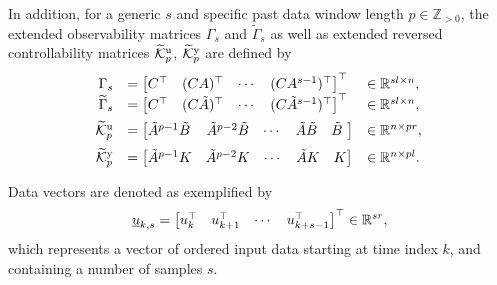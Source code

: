 In addition, for a generic $s$ and specific past data window length $p\in\mathbb{Z}_{>0}$, the extended observability matrices $\Gamma_s$ and $\widetilde{\Gamma}_s$ as well as extended reversed controllability matrices $\widetilde{\mathcal{K}}_{p}^{\mathrm{{u}}}$, $\widetilde{\mathcal{K}}_{p}^{\mathrm{{y}}}$ are defined by
$$\begin{array}{rll}
\Gamma_s &= \begin{bmatrix}C^\top & (CA)^\top & \cdots & (CA^{s-1})^\top\end{bmatrix}^\top&\in\mathbb{R}^{sl\times n},\\
\widetilde{\Gamma}_s &= \begin{bmatrix}C^\top & (C\tilde{A})^\top & \cdots & (C\tilde{A}^{s-1})^\top\end{bmatrix}^\top&\in\mathbb{R}^{sl\times n},\\
\tKp{u} &= \begin{bmatrix} \tilde{A}^{p-1}\tilde{B}\, & \tilde{A}^{p-2}\tilde{B} & \cdots & \tilde{A}\tilde{B} & \tilde{B}\,\,\end{bmatrix}&\in\mathbb{R}^{n\times pr},\vphantom{\bigg|}\\%
\tKp{y} &= \begin{bmatrix} \tilde{A}^{p-1}K & \tilde{A}^{p-2}K & \cdots & \tilde{A}K & K \end{bmatrix}&\in\mathbb{R}^{n\times pl}.
\end{array}$$

Data vectors are denoted as exemplified by
\begin{align*}
    \underline{u}_{k,s} = \begin{bmatrix} u_k^\top & u_{k+1}^\top & \cdots & u_{k+s-1}^\top\end{bmatrix}^\top\in\mathbb{R}^{sr},
\end{align*}
which represents a vector of ordered input data starting at time index $k$, and containing a number of samples $s$.

